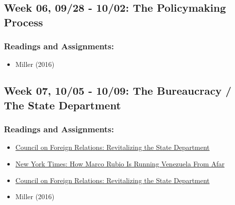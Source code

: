 \documentclass[
  letterpaper,
  DIV=11,
  numbers=noendperiod]{scrartcl}
\providecommand{\tightlist}{%
  \setlength{\itemsep}{0pt}\setlength{\parskip}{0pt}}
\begin{document}
\subsection{Week 06, 09/28 - 10/02: The Policymaking
Process}\label{week-06-0928---1002-the-policymaking-process}

\subsubsection{Readings and
Assignments:}\label{readings-and-assignments-5}

\begin{itemize}
\tightlist
\item
  Miller (2016)
\end{itemize}

\subsection{Week 07, 10/05 - 10/09: The Bureaucracy / The State
Department}\label{week-07-1005---1009-the-bureaucracy-the-state-department}

\subsubsection{Readings and
Assignments:}\label{readings-and-assignments-6}

\begin{itemize}
\tightlist
\item
  \href{https://assets.cfr.org/images/csr89_final/csr89_final.pdf}{Council
  on Foreign Relations: Revitalizing the State Department}
\item
  \href{https://www.nytimes.com/2026/07/11/us/politics/how-marco-rubio-runs-venezuela.html}{New
  York Times: How Marco Rubio Is Running Venezuela From Afar}
\end{itemize}

\begin{tcolorbox}[enhanced jigsaw, arc=.35mm, bottomrule=.15mm, bottomtitle=1mm, breakable, colback=white, colbacktitle=quarto-callout-important-color!10!white, colframe=quarto-callout-important-color-frame, coltitle=black, left=2mm, leftrule=.75mm, opacityback=0, opacitybacktitle=0.6, rightrule=.15mm, title=\textcolor{quarto-callout-important-color}{\faExclamation}\hspace{0.5em}{Friday 10/09: Discussion Day}, titlerule=0mm, toprule=.15mm, toptitle=1mm]

\begin{itemize}
\tightlist
\item
  \href{https://assets.cfr.org/images/csr89_final/csr89_final.pdf}{Council
  on Foreign Relations: Revitalizing the State Department}
\item
  Miller (2016)
\end{itemize}

\end{tcolorbox}
\end{document}
